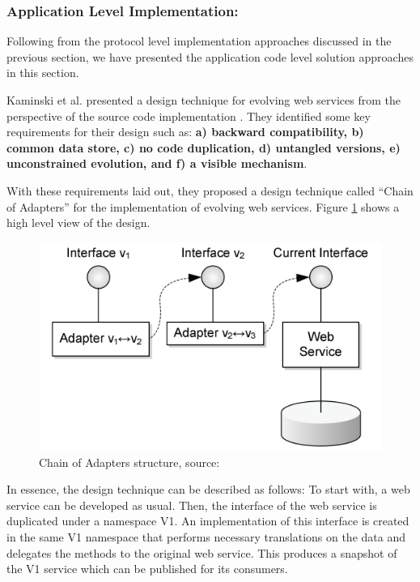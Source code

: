 \documentclass[runningheads,a4paper]{llncs}
\begin{document}
\subsubsection{Application Level Implementation:}

Following from the protocol level implementation approaches discussed in the previous section, we have presented the application code level solution approaches in this section.

Kaminski et al. presented a design technique for evolving web services from the perspective of the source code implementation \cite{kaminski2006design}. They identified some key requirements for their design such as: \textbf{a) backward compatibility, b) common data store, c) no code duplication, d) untangled versions, e) unconstrained evolution, and f) a visible mechanism}.

With these requirements laid out, they proposed a design technique called ``Chain of Adapters'' for the implementation of evolving web services. Figure \ref{fig:chain_of_adapters} shows a high level view of the design.

\begin{figure}[ht]
  \centering
  \includegraphics[width=\textwidth]{chain_of_adapters.png}
    \caption{Chain of Adapters structure, source: \cite{kaminski2006design}}
  \label{fig:chain_of_adapters}
\end{figure}

In essence, the design technique can be described as follows: To start with, a web service can be developed as usual. Then, the interface of the web service is duplicated under a namespace V1. An implementation of this interface is created in the same V1 namespace that performs necessary translations on the data and delegates the methods to the original web service. This produces a snapshot of the V1 service which can be published for its consumers.
\end{document}
